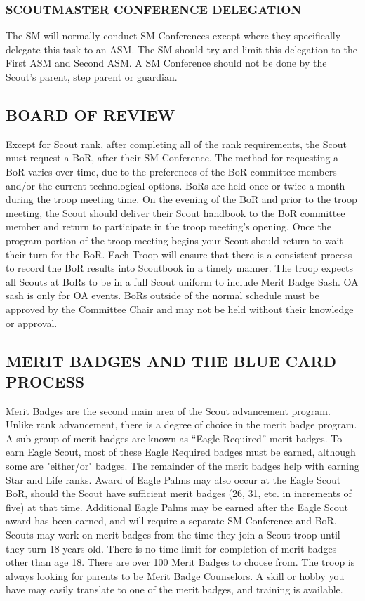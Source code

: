 \documentclass{ltxguide}
\begin{document}
\subsubsection{SCOUTMASTER CONFERENCE DELEGATION}
The \ac{SM} will normally conduct \ac{SM} Conferences except where they specifically delegate this task to an \ac{ASM}. The \ac{SM} should try and limit this delegation to the First \ac{ASM} and Second \ac{ASM}. A \ac{SM} Conference should not be done by the Scout's parent, step parent or guardian.

\subsection{BOARD OF REVIEW}
Except for Scout rank, after completing all of the rank requirements, the Scout must request a \ac{BoR}, after their \ac{SM} Conference. The method for requesting a \ac{BoR} varies over time, due to the preferences of the \ac{BoR} committee members and/or the current technological options. \acp{BoR} are held once or twice a month during the troop meeting time. On the evening of the \ac{BoR} and prior to the troop meeting, the Scout should deliver their Scout handbook  to the \ac{BoR} committee member and return to participate in the troop meeting's opening. Once the program portion of the troop meeting begins your Scout should return to wait their turn for the \ac{BoR}. Each Troop will ensure that there is a consistent process to record the BoR results into Scoutbook in a timely manner. The troop expects all Scouts at \acp{BoR} to be in a full Scout uniform to include Merit Badge Sash. OA sash is only for OA events. \acp{BoR} outside of the normal schedule must be approved by the Committee Chair and may not be held without their knowledge or approval.

\subsection{MERIT BADGES AND THE BLUE CARD PROCESS}
Merit Badges are the second main area of the Scout advancement program. Unlike rank advancement, there is a degree of choice in the merit badge program. A sub-group of merit badges are known as “Eagle Required” merit badges. To earn Eagle Scout, most of these Eagle Required badges must be earned, although some are "either/or" badges. The remainder of the merit badges help with earning Star and Life ranks. Award of Eagle Palms may also occur at the Eagle Scout \ac{BoR}, should the Scout have sufficient merit badges (26, 31, etc. in increments of five) at that time. Additional Eagle Palms may be earned after the Eagle Scout award has been earned, and will require a separate \ac{SM} Conference and \ac{BoR}. Scouts may work on merit badges from the time they join a Scout troop until they turn 18 years old. There is no time limit for completion of merit badges other than age 18. There are over 100         Merit Badges to choose from. The troop is always looking for parents to be Merit Badge Counselors. A skill or hobby you have may easily translate to one of the merit badges, and training is available.
\end{document}
